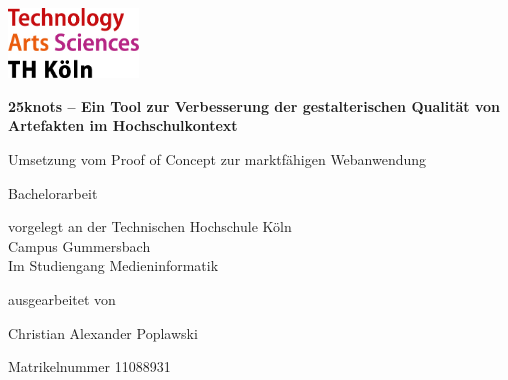 \begin{titlepage}

\begin{center}

\begin{flushleft}
\includegraphics[width=0.26\textwidth]{images/logo_th.jpg}
\end{flushleft}

\vspace{1.6cm}

{\Large\textbf{25knots – Ein Tool zur Verbesserung der gestalterischen Qualität von Artefakten im Hochschulkontext}\par}
\vspace{0.5cm}
\begin{large}
Umsetzung vom Proof of Concept zur marktfähigen Webanwendung
\end{large}

\vspace{1.6cm}

\begin{LARGE}
\begin{scshape}
Bachelorarbeit\\
\end{scshape}
\end{LARGE}

\vspace{0.8cm}

\begin{large}
vorgelegt an der Technischen Hochschule Köln\\
Campus Gummersbach\\
Im Studiengang Medieninformatik\\
\end{large}
\vspace{0.8cm}

ausgearbeitet von\\
\vspace{0.2cm}
\begin{large}
Christian Alexander Poplawski\\
\begin{scshape}
Matrikelnummer 11088931
\end{scshape}
\end{large}


\end{center}
\end{titlepage}
